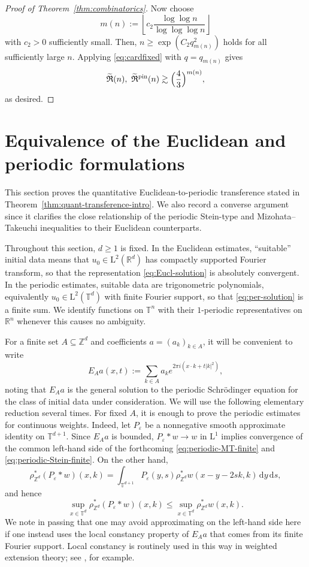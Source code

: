 \documentclass[11pt,reqno]{amsart}
\numberwithin{equation}{section}
\newcommand{\dd}{\,\mathrm{d}}
\renewcommand{\leq}{\leqslant}
\renewcommand{\geq}{\geqslant}
\begin{document}
\begin{proof}[Proof of Theorem~\ref{thm:combinatorics}]
Now choose 
\[ m(n):=\left\lfloor c_2\frac{\log\log n}{\log\log\log n}\right\rfloor \]
with $c_2>0$ sufficiently small. Then, $n\geq\exp(C_2 q_{m(n)}^2)$ holds for all sufficiently large $n$.
Applying \eqref{eq:cardfixed} with $q=q_{m(n)}$ gives
\[ \widetilde{\mathfrak{R}}(n),\ \widetilde{\mathfrak{R}}^{\mathrm{pin}}(n) \gtrsim \Bigl(\frac{4}{3}\Bigr)^{m(n)}, \]
as desired.
\end{proof}


\section{Equivalence of the Euclidean and periodic formulations}
\label{sec:transference}
This section proves the quantitative Euclidean-to-periodic transference stated in Theorem~\ref{thm:quant-transference-intro}. We also record a converse argument since it clarifies the close relationship of the periodic Stein-type and Mizohata--Takeuchi inequalities to their Euclidean counterparts.

Throughout this section, $d\geq1$ is fixed. In the Euclidean estimates, ``suitable'' initial data means that $u_0\in \mathrm{L}^2(\mathbb{R}^d)$ has compactly supported Fourier transform, so that the representation \eqref{eq:Eucl-solution} is absolutely convergent. In the periodic estimates, suitable data are trigonometric polynomials, equivalently $u_0\in\mathrm{L}^2(\mathbb{T}^d)$ with finite Fourier support, so that \eqref{eq:per-solution} is a finite sum. We identify functions on $\mathbb{T}^n$ with their $1$-periodic representatives on $\mathbb{R}^n$ whenever this causes no ambiguity.

For a finite set $A\subseteq\mathbb{Z}^d$ and coefficients $a=(a_k)_{k\in A}$, it will be convenient to write
\[ E_Aa(x,t):=\sum_{k\in A}a_k e^{2\pi i(x\cdot k+t|k|^2)}, \]
noting that $E_Aa$ is the general solution to the periodic Schr\"{o}dinger equation for the class of initial data under consideration.
We will use the following elementary reduction several times. For fixed $A$, it is enough to prove the periodic estimates for continuous weights. Indeed, let $P_\varepsilon$ be a nonnegative smooth approximate identity on $\mathbb{T}^{d+1}$. Since $E_Aa$ is bounded, $P_\varepsilon\ast w\to w$ in $\mathrm{L}^1$ implies convergence of the common left-hand side of the forthcoming \eqref{eq:periodic-MT-finite} and \eqref{eq:periodic-Stein-finite}. On the other hand,
\[ \rho_{\mathbb{Z}^d}^{\ast}(P_\varepsilon\ast w)(x,k)
=\int_{\mathbb{T}^{d+1}}P_\varepsilon(y,s)\rho_{\mathbb{Z}^d}^{\ast}w(x-y-2sk,k)\dd y\dd s, \]
and hence
\[ \sup_{x\in\mathbb{T}^d}\rho_{\mathbb{Z}^d}^{\ast}(P_\varepsilon\ast w)(x,k)
\leq \sup_{x\in\mathbb{T}^d}\rho_{\mathbb{Z}^d}^{\ast}w(x,k). \]
We note in passing that one may avoid approximating on the left-hand side here if one instead uses the local constancy property of $E_Aa$ that comes from its finite Fourier support. Local constancy is routinely used in this way in weighted extension theory; see \cite{CIW}, for example.
\end{document}
